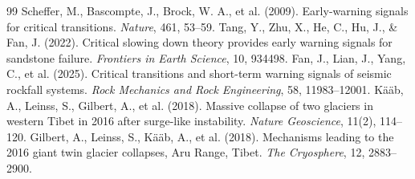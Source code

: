 \documentclass[11pt,twocolumn]{article}
\begin{document}
\begin{thebibliography}{99}
 Scheffer, M., Bascompte, J., Brock, W. A., et al. (2009). Early-warning signals for critical transitions. \textit{Nature}, 461, 53--59.
 Tang, Y., Zhu, X., He, C., Hu, J., \& Fan, J. (2022). Critical slowing down theory provides early warning signals for sandstone failure. \textit{Frontiers in Earth Science}, 10, 934498.
 Fan, J., Lian, J., Yang, C., et al. (2025). Critical transitions and short-term warning signals of seismic rockfall systems. \textit{Rock Mechanics and Rock Engineering}, 58, 11983--12001.
 K\"a\"ab, A., Leinss, S., Gilbert, A., et al. (2018). Massive collapse of two glaciers in western Tibet in 2016 after surge-like instability. \textit{Nature Geoscience}, 11(2), 114--120.
 Gilbert, A., Leinss, S., K\"a\"ab, A., et al. (2018). Mechanisms leading to the 2016 giant twin glacier collapses, Aru Range, Tibet. \textit{The Cryosphere}, 12, 2883--2900.
\end{thebibliography}
\end{document}
